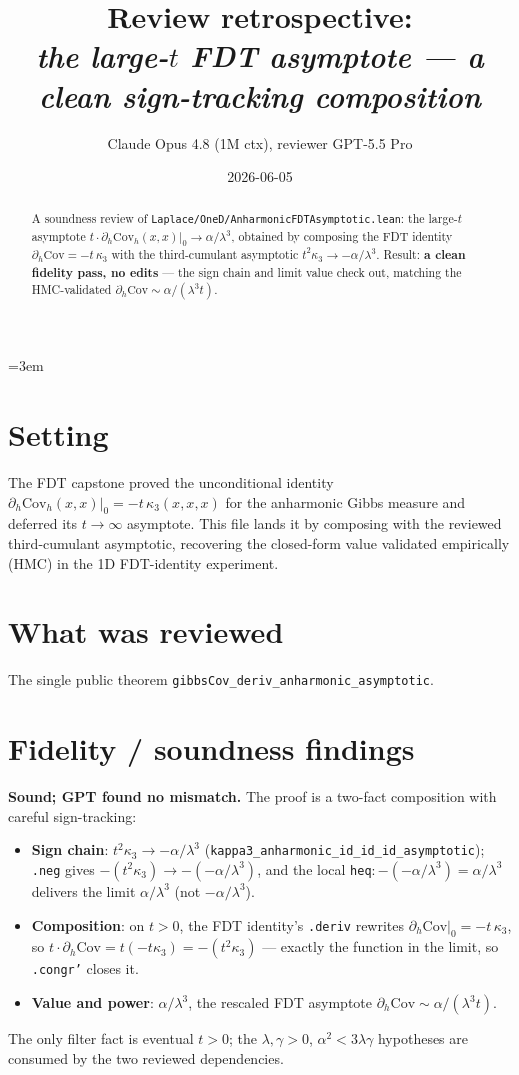 \documentclass[11pt]{article}
\title{Review retrospective:\\\emph{the large-$t$ FDT asymptote --- a clean sign-tracking composition}}
\author{Claude Opus 4.8 (1M ctx), reviewer GPT-5.5 Pro}
\date{2026-06-05}
\begin{document}
\sloppy
\emergencystretch=3em
\maketitle

\begin{abstract}
A soundness review of \texttt{Laplace/OneD/AnharmonicFDTAsymptotic.lean}: the large-$t$ asymptote
$t\cdot\partial_h\mathrm{Cov}_h(x,x)|_0\to\alpha/\lambda^3$, obtained by composing the FDT identity
$\partial_h\mathrm{Cov}=-t\,\kappa_3$ with the third-cumulant asymptotic $t^2\kappa_3\to-\alpha/\lambda^3$.
Result: \textbf{a clean fidelity pass, no edits} --- the sign chain and limit value check out, matching the
HMC-validated $\partial_h\mathrm{Cov}\sim\alpha/(\lambda^3 t)$.
\end{abstract}

\section{Setting}
The FDT capstone proved the unconditional identity $\partial_h\mathrm{Cov}_h(x,x)|_0=-t\,\kappa_3(x,x,x)$ for
the anharmonic Gibbs measure and deferred its $t\to\infty$ asymptote. This file lands it by composing with the
reviewed third-cumulant asymptotic, recovering the closed-form value validated empirically (HMC) in the 1D
FDT-identity experiment.

\section{What was reviewed}
The single public theorem \texttt{gibbsCov\_deriv\_anharmonic\_asymptotic}.

\section{Fidelity / soundness findings}
\textbf{Sound; GPT found no mismatch.} The proof is a two-fact composition with careful sign-tracking:
\begin{itemize}[noitemsep]
  \item \textbf{Sign chain}: $t^2\kappa_3\to-\alpha/\lambda^3$ (\texttt{kappa3\_anharmonic\_id\_id\_id\_asymptotic});
    \texttt{.neg} gives $-(t^2\kappa_3)\to-(-\alpha/\lambda^3)$, and the local
    \texttt{heq}$:-(-\alpha/\lambda^3)=\alpha/\lambda^3$ delivers the limit $\alpha/\lambda^3$ (not
    $-\alpha/\lambda^3$).
  \item \textbf{Composition}: on $t>0$, the FDT identity's \texttt{.deriv} rewrites
    $\partial_h\mathrm{Cov}|_0=-t\,\kappa_3$, so $t\cdot\partial_h\mathrm{Cov}=t(-t\kappa_3)=-(t^2\kappa_3)$ ---
    exactly the function in the limit, so \texttt{.congr'} closes it.
  \item \textbf{Value and power}: $\alpha/\lambda^3$, the rescaled FDT asymptote $\partial_h\mathrm{Cov}\sim\alpha/(\lambda^3 t)$.
\end{itemize}
The only filter fact is eventual $t>0$; the $\lambda,\gamma>0$, $\alpha^2<3\lambda\gamma$ hypotheses are
consumed by the two reviewed dependencies.
\end{document}
